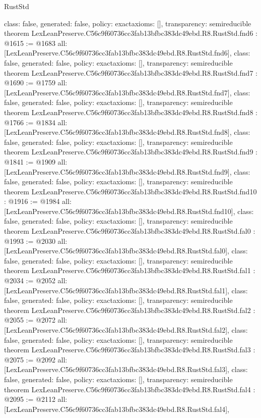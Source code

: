 \begin{lexlean}{RustStd}
\begin{coremodule}
{  class: false,
  generated: false,
  policy: exact{axioms: []},
  transparency: semireducible
}
theorem LexLeanPreserve.C56c9f60736cc3fab13bfbc383dc49ebd.R8.RustStd.fnd6 : @1615 := @1683 {
  all: [LexLeanPreserve.C56c9f60736cc3fab13bfbc383dc49ebd.R8.RustStd.fnd6],
  class: false,
  generated: false,
  policy: exact{axioms: []},
  transparency: semireducible
}
theorem LexLeanPreserve.C56c9f60736cc3fab13bfbc383dc49ebd.R8.RustStd.fnd7 : @1690 := @1759 {
  all: [LexLeanPreserve.C56c9f60736cc3fab13bfbc383dc49ebd.R8.RustStd.fnd7],
  class: false,
  generated: false,
  policy: exact{axioms: []},
  transparency: semireducible
}
theorem LexLeanPreserve.C56c9f60736cc3fab13bfbc383dc49ebd.R8.RustStd.fnd8 : @1766 := @1834 {
  all: [LexLeanPreserve.C56c9f60736cc3fab13bfbc383dc49ebd.R8.RustStd.fnd8],
  class: false,
  generated: false,
  policy: exact{axioms: []},
  transparency: semireducible
}
theorem LexLeanPreserve.C56c9f60736cc3fab13bfbc383dc49ebd.R8.RustStd.fnd9 : @1841 := @1909 {
  all: [LexLeanPreserve.C56c9f60736cc3fab13bfbc383dc49ebd.R8.RustStd.fnd9],
  class: false,
  generated: false,
  policy: exact{axioms: []},
  transparency: semireducible
}
theorem LexLeanPreserve.C56c9f60736cc3fab13bfbc383dc49ebd.R8.RustStd.fnd10 : @1916 := @1984 {
  all: [LexLeanPreserve.C56c9f60736cc3fab13bfbc383dc49ebd.R8.RustStd.fnd10],
  class: false,
  generated: false,
  policy: exact{axioms: []},
  transparency: semireducible
}
theorem LexLeanPreserve.C56c9f60736cc3fab13bfbc383dc49ebd.R8.RustStd.fal0 : @1993 := @2030 {
  all: [LexLeanPreserve.C56c9f60736cc3fab13bfbc383dc49ebd.R8.RustStd.fal0],
  class: false,
  generated: false,
  policy: exact{axioms: []},
  transparency: semireducible
}
theorem LexLeanPreserve.C56c9f60736cc3fab13bfbc383dc49ebd.R8.RustStd.fal1 : @2034 := @2052 {
  all: [LexLeanPreserve.C56c9f60736cc3fab13bfbc383dc49ebd.R8.RustStd.fal1],
  class: false,
  generated: false,
  policy: exact{axioms: []},
  transparency: semireducible
}
theorem LexLeanPreserve.C56c9f60736cc3fab13bfbc383dc49ebd.R8.RustStd.fal2 : @2055 := @2072 {
  all: [LexLeanPreserve.C56c9f60736cc3fab13bfbc383dc49ebd.R8.RustStd.fal2],
  class: false,
  generated: false,
  policy: exact{axioms: []},
  transparency: semireducible
}
theorem LexLeanPreserve.C56c9f60736cc3fab13bfbc383dc49ebd.R8.RustStd.fal3 : @2075 := @2092 {
  all: [LexLeanPreserve.C56c9f60736cc3fab13bfbc383dc49ebd.R8.RustStd.fal3],
  class: false,
  generated: false,
  policy: exact{axioms: []},
  transparency: semireducible
}
theorem LexLeanPreserve.C56c9f60736cc3fab13bfbc383dc49ebd.R8.RustStd.fal4 : @2095 := @2112 {
  all: [LexLeanPreserve.C56c9f60736cc3fab13bfbc383dc49ebd.R8.RustStd.fal4],
}
\end{coremodule}
\end{lexlean}
